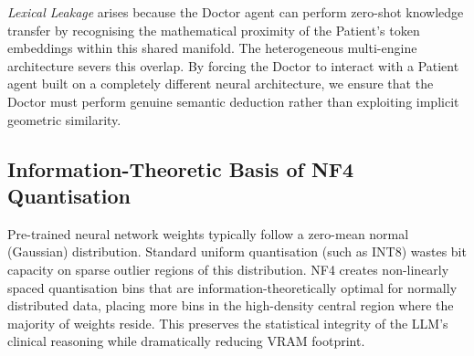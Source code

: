 \textit{Lexical Leakage} arises because the Doctor agent can perform zero-shot knowledge transfer by recognising the mathematical proximity of the Patient's token embeddings within this shared manifold. The heterogeneous multi-engine architecture severs this overlap. By forcing the Doctor to interact with a Patient agent built on a completely different neural architecture, we ensure that the Doctor must perform genuine semantic deduction rather than exploiting implicit geometric similarity.

\subsection{Information-Theoretic Basis of NF4 Quantisation}

Pre-trained neural network weights typically follow a zero-mean normal (Gaussian) distribution. Standard uniform quantisation (such as INT8) wastes bit capacity on sparse outlier regions of this distribution. NF4 creates non-linearly spaced quantisation bins that are information-theoretically optimal for normally distributed data, placing more bins in the high-density central region where the majority of weights reside. This preserves the statistical integrity of the LLM's clinical reasoning while dramatically reducing VRAM footprint.
